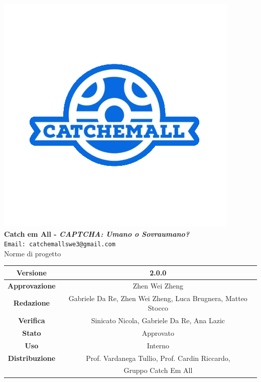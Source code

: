 \begin{titlepage}
\begin{center}
	\includegraphics[scale = 1.5]{img/logo.png}\\
	\bigskip
	\large \textbf{Catch em All - \textit{CAPTCHA: Umano o Sovraumano?}}\\
	\texttt{Email: catchemallswe3@gmail.com}\\
	\vfill
	{\fontsize{1.5cm}{0}\selectfont Norme di progetto}\\
	\vfill
	\setlength\extrarowheight{5pt}
	\begin{tabularx}{\textwidth}{| c | c |}
		\hline
		\textbf{Versione} & 2.0.0\\
		\hline
		\textbf{Approvazione} & Zhen Wei Zheng\\
		\hline
		\textbf{Redazione} & Gabriele Da Re, Zhen Wei Zheng, Luca Brugnera, Matteo Stocco\\
		\hline
		\textbf{Verifica} & Sinicato Nicola, Gabriele Da Re, Ana Lazic\\
		\hline
		\textbf{Stato} & Approvato\\
		\hline
		\textbf{Uso} & Interno\\
		\hline
		\textbf{Distribuzione} & Prof. Vardanega Tullio, Prof. Cardin Riccardo,\\
		 & Gruppo Catch Em All\\
		\hline
	\end{tabularx}
\end{center}
\end{titlepage}
